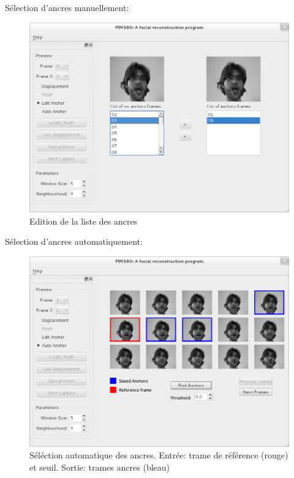 \documentclass[a4paper,12pt]{article}
\begin{document}
Sélection d'ancres manuellement: 

\begin{figure}[ht!]
  \begin{center}
    \includegraphics[scale=0.4]{img/editAnchorList.png}
    \caption{Edition de la liste des ancres}
  \end{center}
\end{figure}

Sélection d'ancres automatiquement:

\begin{figure}[ht!]
  \begin{center}
    \includegraphics[scale=0.4]{img/AnchorAutomaticSelection.png}
    \caption{Séléction automatique des ancres. Entrée: trame de référence (rouge) et seuil. Sortie: trames ancres (bleau)}
  \end{center}
\end{figure}
\end{document}
